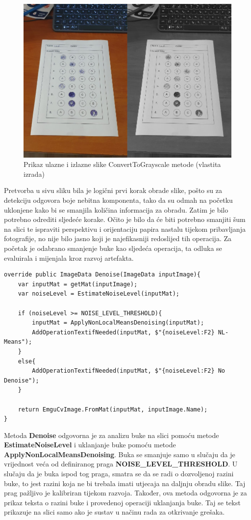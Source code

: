 \documentclass{foi}
\begin{document}
\begin{figure}[H]
\centering
\includegraphics[width=0.8\linewidth]{slike/ToGrayscale.png}
\caption{Prikaz ulazne i izlazne slike ConvertToGrayscale metode (vlastita izrada)}
\end{figure}

Pretvorba u sivu sliku bila je logični prvi korak obrade slike, pošto su za detekciju odgovora boje nebitna komponenta, tako da su odmah na početku uklonjene kako bi se smanjila količina informacija za obradu. Zatim je bilo potrebno odrediti sljedeće korake. Očito je bilo da će biti potrebno smanjiti šum na slici te ispraviti perspektivu i orijentaciju papira nastalu tijekom pribavljanja fotografije, no nije bilo jasno koji je najefikasniji redoslijed tih operacija. Za početak je odabrano smanjenje buke kao sljedeća operacija, ta odluka se evaluirala i mijenjala kroz razvoj artefakta.

\begin{lstlisting}[caption={Metoda za smanjenje buke na slici}]
override public ImageData Denoise(ImageData inputImage){
    var inputMat = getMat(inputImage);
    var noiseLevel = EstimateNoiseLevel(inputMat);

    if (noiseLevel >= NOISE_LEVEL_THRESHOLD){
        inputMat = ApplyNonLocalMeansDenoising(inputMat);
        AddOperationTextifNeeded(inputMat, $"{noiseLevel:F2} NL-Means");
    }
    else{
        AddOperationTextifNeeded(inputMat, $"{noiseLevel:F2} No Denoise");
    }

    return EmguCvImage.FromMat(inputMat, inputImage.Name);
}
\end{lstlisting}

Metoda \textbf{Denoise} odgovorna je za analizu buke na slici pomoću metode \textbf{EstimateNoiseLevel} i uklanjanje buke pomoću metode \textbf{ApplyNonLocalMeansDenoising}. Buka se smanjuje samo u slučaju da je vrijednost veća od definiranog praga \textbf{NOISE\_LEVEL\_THRESHOLD}. U slučaju da je buka ispod tog praga, smatra se da se radi o dozvoljenoj razini buke, to jest razini koja ne bi trebala imati utjecaja na daljnju obradu slike. Taj prag pažljivo je kalibriran tijekom razvoja. Također, ova metoda odgovorna je za prikaz teksta o razini buke i provedenoj operaciji uklanjanja buke. Taj se tekst prikazuje na slici samo ako je sustav u načinu rada za otkrivanje grešaka.
\end{document}
